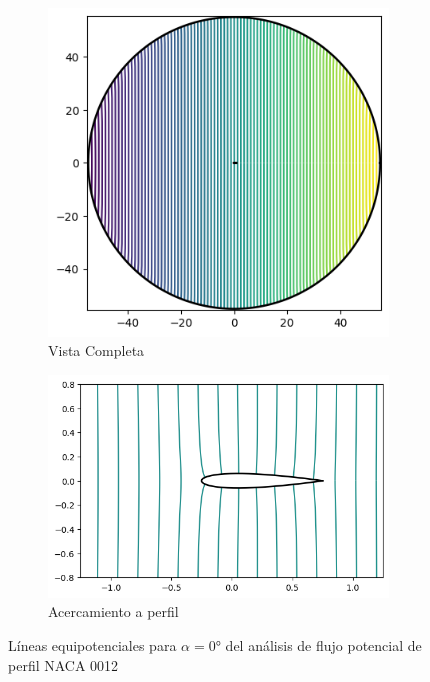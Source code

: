 \documentclass[letterpaper, openright, 12pt]{book}
\begin{document}
    \begin{figure}[htbp!]
        \centering
        \begin{subfigure}[c]{0.48\textwidth}
            \includegraphics[keepaspectratio, width=0.99\textwidth]
                {./img/potential_flow_potential_far}
            \caption{Vista Completa}
            \label{fig:potential_flow_potential_far}
        \end{subfigure}
        \hfill
        \begin{subfigure}[c]{0.48\textwidth}
            \includegraphics[keepaspectratio, width=0.99\textwidth]
                {./img/potential_flow_potential_close}
            \caption{Acercamiento a perfil}
            \label{fig:potential_flow_potential}
        \end{subfigure}
        \caption{Líneas equipotenciales para $\alpha = 0\si{\degree}$
            del análisis de flujo potencial de perfil NACA 0012}
        \label{fig:potential_flow_potential}
    \end{figure}
\end{document}
